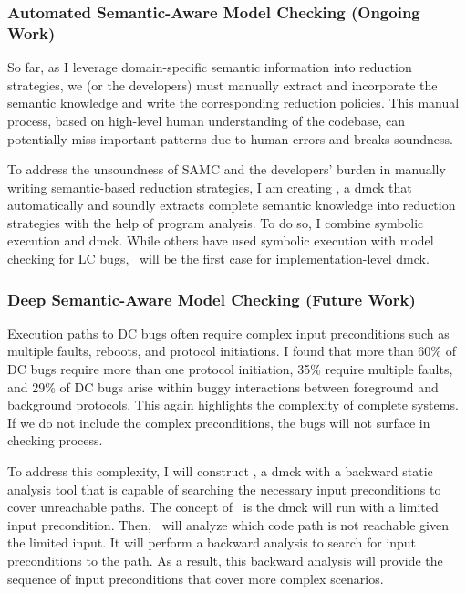 \documentclass[11pt]{article}
\begin{document}
\subsubsection*{Automated Semantic-Aware Model Checking (Ongoing Work)} 

So far, as I leverage domain-specific semantic information into reduction
strategies, we (or the developers) must manually extract and incorporate the
semantic knowledge and write the corresponding reduction policies. This manual
process, based on high-level human understanding of the codebase, can
potentially miss important patterns due to human errors and breaks soundness.

To address the unsoundness of SAMC and the developers' burden in manually
writing semantic-based reduction strategies, I am creating \autocheck, a dmck
that automatically and soundly extracts complete semantic knowledge into
reduction strategies with the help of program analysis. To do so, I combine
symbolic execution and dmck. While others have used symbolic execution with
model checking for LC bugs, \autocheck\ will be the first case for
implementation-level dmck. 

\subsubsection*{Deep Semantic-Aware Model Checking (Future Work)}

Execution paths to DC bugs often require complex input preconditions such as
multiple faults, reboots, and protocol initiations. I found that more than 60\%
of DC bugs require more than one protocol initiation, 35\% require multiple
faults, and 29\% of DC bugs arise within buggy interactions between foreground
and background protocols.  This again highlights the complexity of complete
systems. If we do not include the complex preconditions, the bugs will not
surface in checking process.

To address this complexity, I will construct \deepcheck, a dmck with a backward
static analysis tool that is capable of searching the necessary input
preconditions to cover unreachable paths. The concept of \deepcheck\ is the dmck
will run with a limited input precondition. Then, \deepcheck\ will analyze which
code path is not reachable given the limited input. It will perform a backward
analysis to search for input preconditions to the path. As a result, this
backward analysis will provide the sequence of input preconditions that cover
more complex scenarios.
\fi
\end{document}
